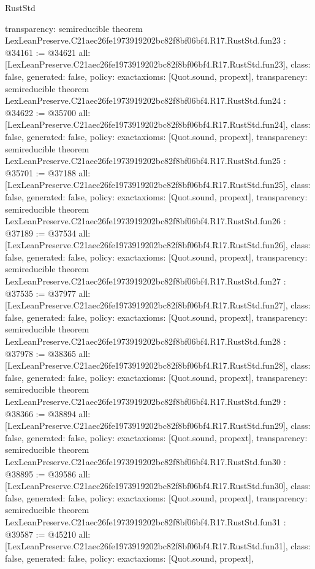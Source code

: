 \begin{lexlean}{RustStd}
\begin{coremodule}
{  transparency: semireducible
}
theorem LexLeanPreserve.C21aec26fe1973919202bc82f8bf06bf4.R17.RustStd.fun23 : @34161 := @34621 {
  all: [LexLeanPreserve.C21aec26fe1973919202bc82f8bf06bf4.R17.RustStd.fun23],
  class: false,
  generated: false,
  policy: exact{axioms: [Quot.sound, propext]},
  transparency: semireducible
}
theorem LexLeanPreserve.C21aec26fe1973919202bc82f8bf06bf4.R17.RustStd.fun24 : @34622 := @35700 {
  all: [LexLeanPreserve.C21aec26fe1973919202bc82f8bf06bf4.R17.RustStd.fun24],
  class: false,
  generated: false,
  policy: exact{axioms: [Quot.sound, propext]},
  transparency: semireducible
}
theorem LexLeanPreserve.C21aec26fe1973919202bc82f8bf06bf4.R17.RustStd.fun25 : @35701 := @37188 {
  all: [LexLeanPreserve.C21aec26fe1973919202bc82f8bf06bf4.R17.RustStd.fun25],
  class: false,
  generated: false,
  policy: exact{axioms: [Quot.sound, propext]},
  transparency: semireducible
}
theorem LexLeanPreserve.C21aec26fe1973919202bc82f8bf06bf4.R17.RustStd.fun26 : @37189 := @37534 {
  all: [LexLeanPreserve.C21aec26fe1973919202bc82f8bf06bf4.R17.RustStd.fun26],
  class: false,
  generated: false,
  policy: exact{axioms: [Quot.sound, propext]},
  transparency: semireducible
}
theorem LexLeanPreserve.C21aec26fe1973919202bc82f8bf06bf4.R17.RustStd.fun27 : @37535 := @37977 {
  all: [LexLeanPreserve.C21aec26fe1973919202bc82f8bf06bf4.R17.RustStd.fun27],
  class: false,
  generated: false,
  policy: exact{axioms: [Quot.sound, propext]},
  transparency: semireducible
}
theorem LexLeanPreserve.C21aec26fe1973919202bc82f8bf06bf4.R17.RustStd.fun28 : @37978 := @38365 {
  all: [LexLeanPreserve.C21aec26fe1973919202bc82f8bf06bf4.R17.RustStd.fun28],
  class: false,
  generated: false,
  policy: exact{axioms: [Quot.sound, propext]},
  transparency: semireducible
}
theorem LexLeanPreserve.C21aec26fe1973919202bc82f8bf06bf4.R17.RustStd.fun29 : @38366 := @38894 {
  all: [LexLeanPreserve.C21aec26fe1973919202bc82f8bf06bf4.R17.RustStd.fun29],
  class: false,
  generated: false,
  policy: exact{axioms: [Quot.sound, propext]},
  transparency: semireducible
}
theorem LexLeanPreserve.C21aec26fe1973919202bc82f8bf06bf4.R17.RustStd.fun30 : @38895 := @39586 {
  all: [LexLeanPreserve.C21aec26fe1973919202bc82f8bf06bf4.R17.RustStd.fun30],
  class: false,
  generated: false,
  policy: exact{axioms: [Quot.sound, propext]},
  transparency: semireducible
}
theorem LexLeanPreserve.C21aec26fe1973919202bc82f8bf06bf4.R17.RustStd.fun31 : @39587 := @45210 {
  all: [LexLeanPreserve.C21aec26fe1973919202bc82f8bf06bf4.R17.RustStd.fun31],
  class: false,
  generated: false,
  policy: exact{axioms: [Quot.sound, propext]},
}
\end{coremodule}
\end{lexlean}
